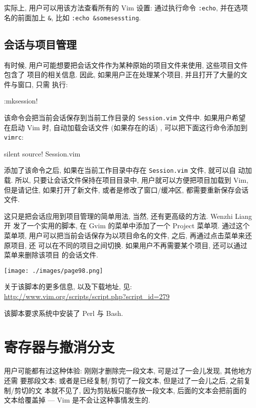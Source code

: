 \begin{warning}
    实际上, 用户可以用该方法查看所有的 Vim 设置: 通过执行命令 \texttt{:echo},
    并在选项名的前面加上 \texttt{\&}, 比如 \texttt{:echo \&somesessting}.
\end{warning}

\subsection{会话与项目管理}
\label{subsec:sessions_as_a_project_manager}

有时候, 用户可能想要把会话文件作为某种原始的项目文件来使用, 这些项目文件包含了
项目的相关信息. 因此, 如果用户正在处理某个项目, 并且打开了大量的文件与窗口, 只需
执行:
\begin{vimcode}
:mksession!
\end{vimcode}
该命令会把当前会话保存到当前工作目录的 \texttt{Session.vim} 文件中. 如果用户希望
在启动 Vim 时, 自动加载会话文件 (如果存在的话) , 可以把下面这行命令添加到
\texttt{vimrc}:
\begin{vimcode}
silent source! Session.vim
\end{vimcode}
添加了该命令之后, 如果在当前工作目录中存在 \texttt{Session.vim} 文件, 就可以自
动加载. 所以, 只要让会话文件保持在项目目录中, 用户就可以方便把项目加载到 Vim,
但是请记住, 如果打开了新文件, 或者是修改了窗口/缓冲区, 都需要重新保存会话文件.

这只是把会话应用到项目管理的简单用法, 当然, 还有更高级的方法. Wenzhi Liang 开
发了一个实用的脚本, 在 Gvim 的菜单中添加了一个 Project 菜单项. 通过这个菜单项,
用户可以把当前会话保存为以项目命名的文件, 之后, 再通过点击菜单来还原项目, 还
可以在不同的项目之间切换. 如果用户不再需要某个项目, 还可以通过菜单来删除该项目
的会话文件.
\begin{center}
    \texttt{[image: ./images/page98.png]}
\end{center}

关于该脚本的更多信息, 以及下载地址, 见:
\url{http://www.vim.org/scripts/script.php?script_id=279}

\begin{warning}
    该脚本要求系统中安装了 Perl 与 Bash.
\end{warning}

\section{寄存器与撤消分支}
\label{sec:registers_and_undo_branching}

用户可能都有过这种体验: 刚刚才删除完一段文本, 可是过了一会儿发现, 其他地方还需
要那段文本; 或者是已经复制/剪切了一段文本, 但是过了一会儿之后, 之前复制/剪切的文
本就不见了, 因为剪贴板只能存放一段文本, 后面的文本会把前面的文本给覆盖掉 ---
Vim 是不会让这种事情发生的.

